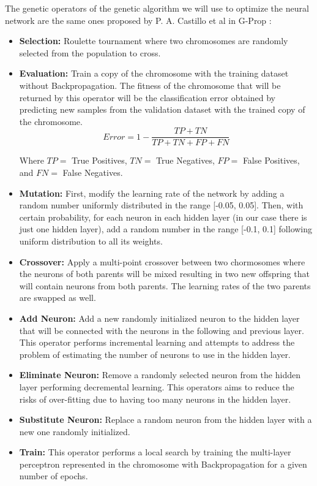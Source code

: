 The genetic operators of the genetic algorithm we will use to optimize the neural network are the same ones proposed by P. A. Castillo et al in G-Prop \cite{gprop}:

\begin{itemize}
	\item \textbf{Selection:} Roulette tournament where two chromosomes are randomly selected from the population to cross.
	
	\item \textbf{Evaluation:} Train a copy of the chromosome with the training dataset without Backpropagation. The fitness of the chromosome that will be returned by this operator will be the classification error obtained by predicting new samples from the validation dataset with the trained copy of the chromosome.
	$$ Error = 1 - \frac{TP + TN}{TP + TN + FP + FN}  $$
	
	Where $TP = $ True Positives, $TN = $ True Negatives, $FP = $ False Positives, and $FN = $ False Negatives.
	
	\item \textbf{Mutation:} First, modify the learning rate of the network by adding a random number uniformly distributed in the range [-0.05, 0.05]. Then, with certain probability, for each neuron in each hidden layer (in our case there is just one hidden layer), add a random number in the range [-0.1, 0.1] following uniform distribution to all its weights.
	
	\item \textbf{Crossover:} Apply a multi-point crossover between two chormosomes where the neurons of both parents will be mixed resulting in two new offspring that will contain neurons from both parents. The learning rates of the two parents are swapped as well.
	
	\item \textbf{Add Neuron:} Add a new randomly initialized neuron to the hidden layer that will be connected with the neurons in the following and previous layer. This operator performs incremental learning and attempts to address the problem of estimating the number of neurons to use in the hidden layer.
	
	\item \textbf{Eliminate Neuron:} Remove a randomly selected neuron from the hidden layer performing decremental learning. This operators aims to reduce the risks of over-fitting due to having too many neurons in the hidden layer.
	
	\item \textbf{Substitute Neuron:} Replace a random neuron from the hidden layer with a new one randomly initialized.
	
	\item \textbf{Train:} This operator performs a local search by training the multi-layer perceptron represented in the chromosome with Backpropagation \cite{backpropagation} for a given number of epochs.
\end{itemize}

